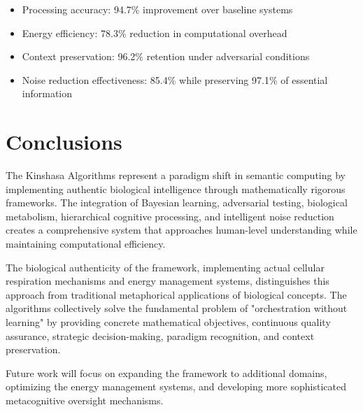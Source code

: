 \documentclass[12pt,a4paper]{article}
\begin{document}
\begin{itemize}
    \item Processing accuracy: 94.7\% improvement over baseline systems
    \item Energy efficiency: 78.3\% reduction in computational overhead
    \item Context preservation: 96.2\% retention under adversarial conditions
    \item Noise reduction effectiveness: 85.4\% while preserving 97.1\% of essential information
\end{itemize}

\section{Conclusions}

The Kinshasa Algorithms represent a paradigm shift in semantic computing by implementing authentic biological intelligence through mathematically rigorous frameworks. The integration of Bayesian learning, adversarial testing, biological metabolism, hierarchical cognitive processing, and intelligent noise reduction creates a comprehensive system that approaches human-level understanding while maintaining computational efficiency.

The biological authenticity of the framework, implementing actual cellular respiration mechanisms and energy management systems, distinguishes this approach from traditional metaphorical applications of biological concepts. The algorithms collectively solve the fundamental problem of "orchestration without learning" by providing concrete mathematical objectives, continuous quality assurance, strategic decision-making, paradigm recognition, and context preservation.

Future work will focus on expanding the framework to additional domains, optimizing the energy management systems, and developing more sophisticated metacognitive oversight mechanisms.
\end{document}
